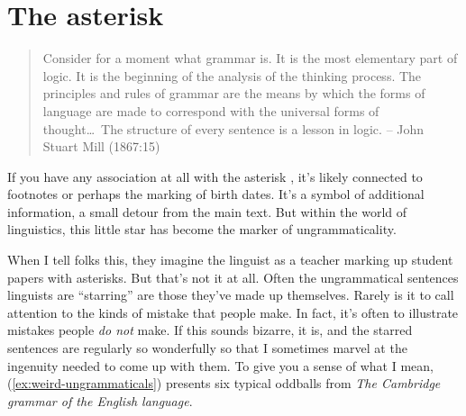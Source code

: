 \chapter{The asterisk}





\begin{quote}
    Consider for a moment what grammar is. It is the most elementary part of logic. It is the beginning of the analysis of the thinking process. The principles and rules of grammar are the means by which the forms of language are made to correspond with the universal forms of thought\dots~The structure of every sentence is a lesson in logic. \hfill -- John Stuart Mill (1867:15)
\end{quote}

If you have any association at all with the asterisk \mentionhead{*}, it's likely connected to footnotes or perhaps the marking of birth dates. It's a symbol of additional information, a small detour from the main text. But within the world of linguistics, this little star has become the marker of ungrammaticality.

When I tell folks this, they imagine the linguist as a teacher marking up student papers with asterisks. But that's not it at all. Often the ungrammatical sentences linguists are \enquote{starring} are those they've made up themselves. Rarely is it to call attention to the kinds of mistake that people make. In fact, it's often to illustrate mistakes people \emph{do not} make. If this sounds bizarre, it is, and the starred sentences are regularly so wonderfully so that I sometimes marvel at the ingenuity needed to come up with them. To give you a sense of what I mean, (\ref{ex:weird-ungrammaticals}) presents six typical oddballs from \textit{The Cambridge grammar of the English language}.

\ea \label{ex:weird-ungrammaticals}
    \z
\z

